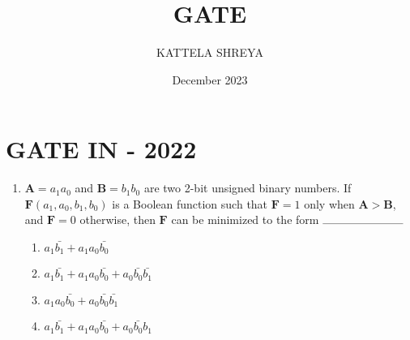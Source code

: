\documentclass[10pt]{article}
\title{GATE}
\author{KATTELA SHREYA}
\date{December 2023}
\let\vec\mathbf
\providecommand{\brak}[1]{\ensuremath{\left(#1\right)}}
\begin{document}
\maketitle
\section*{GATE IN - 2022}
\begin{enumerate}
\item $\vec{A}=a_1a_0$ and $\vec{B}=b_1b_0$ are two 2-bit unsigned binary numbers. If $\vec{F}\brak{a_1,a_0,b_1,b_0}$ is a Boolean function such that $\vec{F} = 1$ only when $\vec{A > B}$, and $\vec{F} = 0$ otherwise, then $\vec{F}$ can be minimized to the form $\rule{2.5cm}{0.10mm}$
\begin{enumerate}
\item $a_1\bar{b_1}+a_1a_0\bar{b_0}$
\item $a_1\bar{b_1}+a_1a_0\bar{b_0}+a_0\bar{b_0}\bar{b_1}$
\item $a_1a_0\bar{b_0}+a_0\bar{b_0}\bar{b_1}$
\item $a_1\bar{b_1}+a_1a_0\bar{b_0}+a_0\bar{b_0}b_1$
\end{enumerate}    
\end{enumerate}
\end{document}
